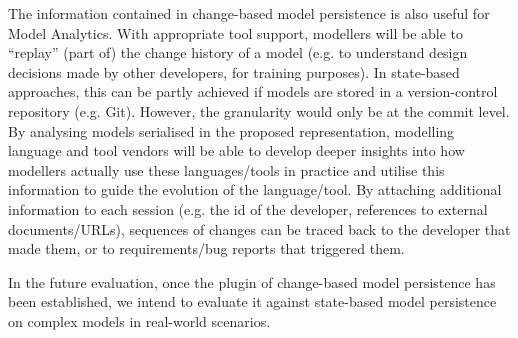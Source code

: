 The information contained in change-based model persistence is also useful for Model Analytics. With appropriate tool support, modellers will be able to ``replay'' (part of) the change history of a model (e.g. to understand design decisions made by other developers, for training purposes). In state-based approaches, this can be partly achieved if models are stored in a version-control repository (e.g. Git). However, the granularity would only be at the commit level. By analysing models serialised in the proposed representation, modelling language and tool vendors will be able to develop deeper insights into how modellers actually use these languages/tools in practice and utilise this information to guide the evolution of the language/tool. By attaching additional information to each session (e.g. the id of the developer, references to external documents/URLs), sequences of changes can be traced back to the developer that made them, or to requirements/bug reports that triggered them.

In the future evaluation, once the plugin of change-based model persistence has been established, we intend to evaluate it against state-based model persistence on complex models in real-world scenarios.

